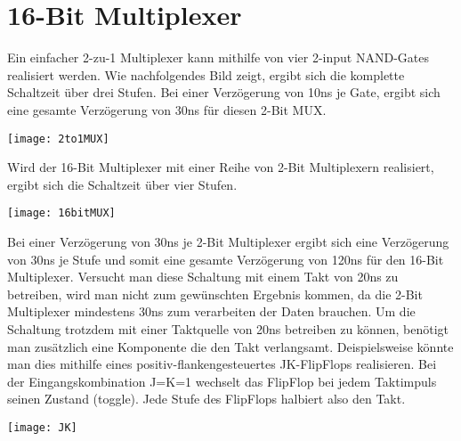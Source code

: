 \documentclass{article}
\newcommand{\enterProblemHeader}[1]{
}
\newcommand{\exitProblemHeader}[1]{
}
\newcounter{homeworkProblemCounter} %
\newcommand{\homeworkProblemName}{}
\newenvironment{homeworkProblem}[1][Problem \arabic{homeworkProblemCounter}]{ %
\stepcounter{homeworkProblemCounter} %
\renewcommand{\homeworkProblemName}{#1} %
\section{\homeworkProblemName} %
\enterProblemHeader{\homeworkProblemName} %
}{
\exitProblemHeader{\homeworkProblemName} %
}
\begin{document}
\clearpage
\begin{homeworkProblem}[16-Bit Multiplexer]
Ein einfacher 2-zu-1 Multiplexer kann mithilfe von vier 2-input NAND-Gates realisiert werden. Wie nachfolgendes Bild zeigt, ergibt sich die
komplette Schaltzeit über drei Stufen. Bei einer Verzögerung von 10ns je Gate, ergibt sich eine gesamte Verzögerung von 30ns für diesen 2-Bit MUX.
\begin{center}
\texttt{[image: 2to1MUX]}
\end{center}
Wird der 16-Bit Multiplexer mit einer Reihe von 2-Bit Multiplexern realisiert, ergibt sich die Schaltzeit über vier Stufen. 
\begin{center}
\texttt{[image: 16bitMUX]} 
\end{center}
Bei einer Verzögerung von 30ns je 2-Bit Multiplexer ergibt sich eine Verzögerung von 30ns je Stufe und somit eine gesamte Verzögerung von 120ns
für den 16-Bit Multiplexer.
\newline
\newline
Versucht man diese Schaltung mit einem Takt von 20ns zu betreiben, wird man nicht zum gewünschten Ergebnis kommen, da die 2-Bit Multiplexer
mindestens 30ns zum verarbeiten der Daten brauchen. Um die Schaltung trotzdem mit einer Taktquelle von 20ns betreiben zu können, benötigt man
zusätzlich eine Komponente die den Takt verlangsamt. Deispielsweise könnte man dies mithilfe eines positiv-flankengesteuertes JK-FlipFlops realisieren. Bei der
Eingangskombination J=K=1 wechselt das FlipFlop bei jedem Taktimpuls seinen Zustand (toggle). Jede Stufe des FlipFlops halbiert also den Takt.
\begin{center}
\texttt{[image: JK]}
\end{center}
\end{homeworkProblem}
\end{document}
